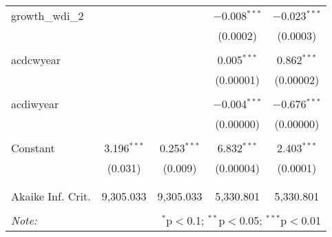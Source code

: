 \begin{table}[!htbp]
\begin{tabular}{@{\extracolsep{5pt}}lcccc}
 growth\_wdi\_2 &  &  & $-$0.008$^{***}$ & $-$0.023$^{***}$ \\ 
  &  &  & (0.0002) & (0.0003) \\ 
  & & & & \\ 
 acdcwyear &  &  & 0.005$^{***}$ & 0.862$^{***}$ \\ 
  &  &  & (0.00001) & (0.00002) \\ 
  & & & & \\ 
 acdiwyear &  &  & $-$0.004$^{***}$ & $-$0.676$^{***}$ \\ 
  &  &  & (0.00000) & (0.00000) \\ 
  & & & & \\ 
 Constant & 3.196$^{***}$ & 0.253$^{***}$ & 6.832$^{***}$ & 2.403$^{***}$ \\ 
  & (0.031) & (0.009) & (0.00004) & (0.0001) \\ 
  & & & & \\ 
\hline \\[-1.8ex] 
Akaike Inf. Crit. & 9,305.033 & 9,305.033 & 5,330.801 & 5,330.801 \\ 
\hline 
\hline \\[-1.8ex] 
\textit{Note:}  & \multicolumn{4}{r}{$^{*}$p$<$0.1; $^{**}$p$<$0.05; $^{***}$p$<$0.01} \\ 
\end{tabular} 
\end{table} 
